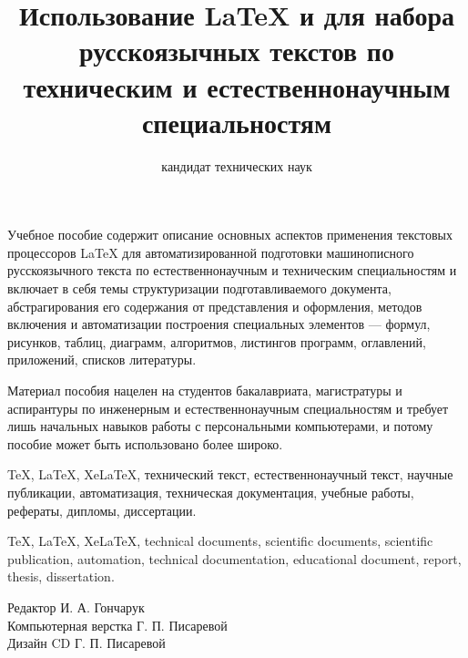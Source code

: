 \documentclass[workbook, draught]{fefudoc}
\author{кандидат технических наук}{доцент департамента электроники, телекоммуникаций и приборостроения Политехнического института}{Чусов Андрей Александрович},
\institute{Политехнический институт}
\title{Использование \LaTeX{} и \XeLaTeX{} для набора русскоязычных текстов по техническим и естественнонаучным специальностям}
\begin{document}
\titlepage{}

\begin{copyrightpage}
	\begin{reviewers}
	\end{reviewers}
	\begin{annotation}
	Учебное пособие содержит описание основных аспектов применения текстовых процессоров \LaTeX{} для автоматизированной подготовки машинописного русскоязычного текста по естественнонаучным и техническим специальностям и включает в себя темы структуризации подготавливаемого документа, абстрагирования его содержания от представления и оформления, методов включения и автоматизации построения специальных элементов --- формул, рисунков, таблиц, диаграмм, алгоритмов, листингов программ, оглавлений, приложений, списков литературы.

	Материал пособия нацелен на студентов бакалавриата, магистратуры и аспирантуры по инженерным и естественнонаучным специальностям и требует лишь начальных навыков работы с персональными компьютерами, и потому пособие может быть использовано более широко.
	\end{annotation}
	\begin{keywords}[ru]
		TeX, LaTeX, XeLaTeX, технический текст, естественнонаучный текст, научные публикации, автоматизация, техническая документация, учебные работы, рефераты, дипломы, диссертации.
	\end{keywords}
	\begin{keywords}[en]
		TeX, LaTeX, XeLaTeX, technical documents, scientific documents, scientific publication, automation, technical documentation, educational document, report, thesis, dissertation.
	\end{keywords}
	\begin{publisherblock}
		\begin{publisherinfo}
			Редактор И. А. Гончарук \\
			Компьютерная верстка Г. П. Писаревой \\
			Дизайн CD Г. П. Писаревой \\
		\end{publisherinfo}


\end{publisherblock}
\end{copyrightpage}
\end{document}
